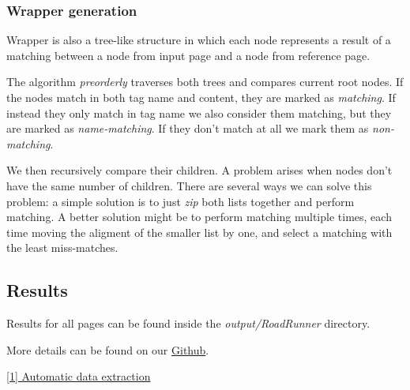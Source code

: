 \documentclass[runningheads]{llncs}
\begin{document}
\subsubsection{Wrapper generation}

Wrapper is also a tree-like structure in which each node represents a result of a matching between a node from input page and a node from reference page. 

The algorithm \textit{preorderly} traverses both trees and compares current root nodes. If the nodes match in both tag name and content, they are marked as \textit{matching}. If instead they only match in tag name we also consider them matching, but they are marked as \textit{name-matching}. If they don't match at all we mark them as \textit{non-matching}.

We then recursively compare their children. A problem arises when nodes don't have the same number of children. There are several ways we can solve this problem: a simple solution is to just \textit{zip} both lists together and perform matching. A better solution might be to perform matching multiple times, each time moving the aligment of the smaller list by one, and select a matching with the least miss-matches.

\subsection{Results}

Results for all pages can be found inside the \textit{output/RoadRunner} directory.

More details can be found on our \href{https://github.com/LampDM/structured_data_extraction_methods/tree/master/RoadRunner}{Github}.

\href{https://www.researchgate.net/publication/221213613_RoadRunner_Automatic_data_extraction_from_data-intensive_Web_sites}{[1] Automatic data extraction}
\end{document}
